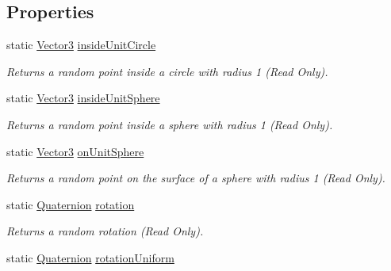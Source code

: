 \subsection*{Properties}
\begin{DoxyCompactItemize}
\item 
static \mbox{\hyperlink{class_lua_1_1_vector3}{Vector3}} \mbox{\hyperlink{class_lua_1_1_random_a2e9c7e49b4362f7ab3335f0a46778b70}{inside\+Unit\+Circle}}
\begin{DoxyCompactList}\small\item\em Returns a random point inside a circle with radius 1 (Read Only). \end{DoxyCompactList}\item 
static \mbox{\hyperlink{class_lua_1_1_vector3}{Vector3}} \mbox{\hyperlink{class_lua_1_1_random_a1c3fa5f6de20e35af1e85564ef928137}{inside\+Unit\+Sphere}}
\begin{DoxyCompactList}\small\item\em Returns a random point inside a sphere with radius 1 (Read Only). \end{DoxyCompactList}\item 
static \mbox{\hyperlink{class_lua_1_1_vector3}{Vector3}} \mbox{\hyperlink{class_lua_1_1_random_a558a1a73871855fb64ba923ebc7353c4}{on\+Unit\+Sphere}}
\begin{DoxyCompactList}\small\item\em Returns a random point on the surface of a sphere with radius 1 (Read Only). \end{DoxyCompactList}\item 
static \mbox{\hyperlink{class_lua_1_1_quaternion}{Quaternion}} \mbox{\hyperlink{class_lua_1_1_random_a2705c860d3280bb5e5d0593d59fad8e3}{rotation}}
\begin{DoxyCompactList}\small\item\em Returns a random rotation (Read Only). \end{DoxyCompactList}\item 
static \mbox{\hyperlink{class_lua_1_1_quaternion}{Quaternion}} \mbox{\hyperlink{class_lua_1_1_random_a99f73343c5e319aff692abcca2ca51a1}{rotation\+Uniform}}

\end{DoxyCompactItemize}
